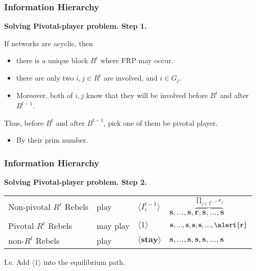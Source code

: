 \documentclass[10pt]{beamer}
\begin{document}
\begin{frame}
  \frametitle{Information Hierarchy}

\textbf{Solving Pivotal-player problem. Step 1.}



\begin{lemma}
If networks are acyclic, then
\begin{itemize}
\item there is a \alert{unique block} $B^t$ where FRP may occur. 
\item there are only \alert{two} $i,j\in R^t$ are involved, and \alert{$i\in G_j$}.
\item Moreover, both of $i,j$ know that they will be involved \alert{before} $B^t$ and \alert{after} $B^{t-1}$.
\end{itemize}


\end{lemma}
Thus, {before} $B^t$ and {after} $B^{t-1}$, pick one of them be pivotal player.
\begin{itemize}
\item By their prim number.
\end{itemize} 


\end{frame}


\begin{frame}
  \frametitle{Information Hierarchy}

\textbf{Solving Pivotal-player problem. Step 2.}

\begin{table}[h]
\begin{tabular}{l l l l}
Non-pivotal $R^t$ Rebels & play & $\langle I^{t-1}_i\rangle$ & $\textbf{s},...,\textbf{s},\overbrace{\textbf{r},\textbf{s},...,\textbf{s}}^{\prod_{j\in I^{t-1}_i}x_j}$ \\
Pivotal $R^t$ Rebels & \alert{may} play & \alert{$\langle 1\rangle$} & $\textbf{s},...,\textbf{s},\textbf{s},\textbf{s},...,\alert{\textbf{r}}$ \\
\hline
non-$R^t$ Rebels & play & $\langle \textbf{stay} \rangle$ & $\textbf{s},...,\textbf{s},\textbf{s},\textbf{s},...,\textbf{s}$  \\

\end{tabular}
\end{table}

I.e. Add \alert{$\langle 1\rangle$} into the equilibrium path.

\end{frame}
\end{document}
